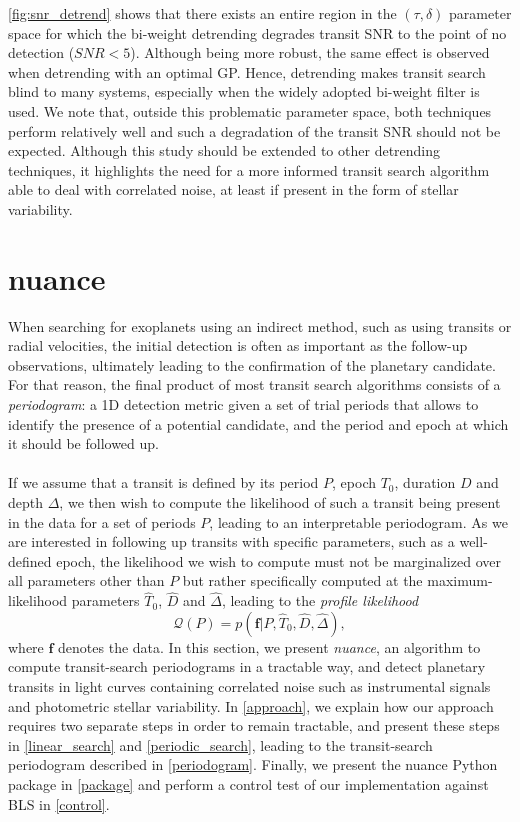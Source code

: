 \documentclass[modern,linenumbers]{aastex631}
\newcommand{\nuancecode}{\textsf{nuance}}
\begin{document}
\autoref{fig:snr_detrend} shows that there exists an entire region in the $(\tau, \delta)$ parameter space for which the bi-weight detrending degrades transit SNR to the point of no detection ($SNR < 5$). Although being more robust, the same effect is observed when detrending with an optimal GP. Hence, detrending makes transit search blind to many systems, especially when the widely adopted bi-weight filter is used. We note that, outside this problematic parameter space, both techniques perform relatively well and such a degradation of the transit SNR should not be expected. Although this study should be extended to other detrending techniques, it highlights the need for a more informed transit search algorithm able to deal with correlated noise, at least if present in the form of stellar variability.

\newpage
\section{\textsf{nuance}}\label{nuance}
When searching for exoplanets using an indirect method, such as using transits or radial velocities, the initial detection is often as important as the follow-up observations, ultimately leading to the confirmation of the planetary candidate. For that reason, the final product of most transit search algorithms consists of a \textit{periodogram}: a 1D detection metric given a set of trial periods that allows to identify the presence of a potential candidate, and the period and epoch at which it should be followed up.\\\\ 
If we assume that a transit is defined by its period $P$, epoch $T_0$, duration $D$ and depth $\Delta$, we then wish to compute the likelihood of such a transit being present in the data for a set of periods $P$, leading to an interpretable periodogram. As we are interested in following up transits with specific parameters, such as a well-defined epoch, the likelihood we wish to compute must not be marginalized over all parameters other than $P$ but rather specifically computed at the maximum-likelihood parameters $\hat T_0$, $\hat D$ and $\hat \Delta$, leading to the \textit{profile likelihood}
\begin{equation}\label{eq:periodogram}
       \mathcal{Q}(P) = p(\bm{f} \vert P, \hat T_0 ,\hat D, \hat \Delta),
\end{equation} 
where $\bm{f}$ denotes the data. In this section, we present \textit{nuance}, an algorithm to compute transit-search periodograms in a tractable way, and detect planetary transits in light curves containing correlated noise such as instrumental signals and photometric stellar variability. In \autoref{approach}, we explain how our approach requires two separate steps in order to remain tractable, and present these steps in \autoref{linear_search} and \autoref{periodic_search}, leading to the transit-search periodogram described in \autoref{periodogram}. Finally, we present the \nuancecode{} Python package in \autoref{package} and perform a control test of our implementation against BLS in \autoref{control}.
\end{document}
